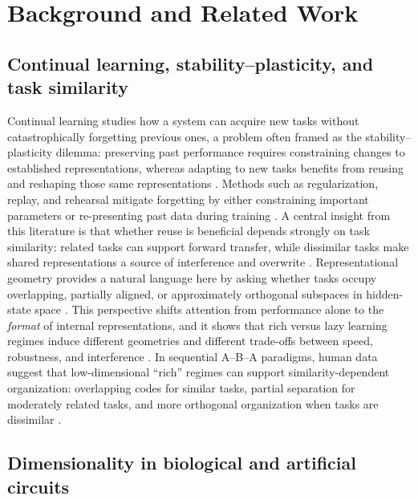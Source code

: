 \documentclass{article}
\theoremstyle{plain}
\theoremstyle{definition}
\theoremstyle{remark}
\begin{document}
\section{Background and Related Work}

\subsection{Continual learning, stability–plasticity, and task similarity}

Continual learning studies how a system can acquire new tasks without catastrophically forgetting previous ones, a problem often framed as the stability–plasticity dilemma: preserving past performance requires constraining changes to established representations, whereas adapting to new tasks benefits from reusing and reshaping those same representations \cite{lee2021continual,holton2025humans}. Methods such as regularization, replay, and rehearsal mitigate forgetting by either constraining important parameters or re-presenting past data during training \cite{kirkpatrick2017overcoming,robins1995catastrophic,rolnick2019experience,wickramasinghe2023continual,van2020brain}. A central insight from this literature is that whether reuse is beneficial depends strongly on task similarity: related tasks can support forward transfer, while dissimilar tasks make shared representations a source of interference and overwrite \cite{lee2021continual,menghi2025impact,holton2025humans,wakhloo2026neural}. Representational geometry provides a natural language here by asking whether tasks occupy overlapping, partially aligned, or approximately orthogonal subspaces in hidden-state space \cite{flesch2022representation}. This perspective shifts attention from performance alone to the \emph{format} of internal representations, and it shows that rich versus lazy learning regimes induce different geometries and different trade-offs between speed, robustness, and interference \cite{flesch2022representation,seguin2022network}. In sequential A–B–A paradigms, human data suggest that low-dimensional “rich” regimes can support similarity-dependent organization: overlapping codes for similar tasks, partial separation for moderately related tasks, and more orthogonal organization when tasks are dissimilar \cite{holton2025humans,menghi2025impact}.

\subsection{Dimensionality in biological and artificial circuits}
\end{document}

